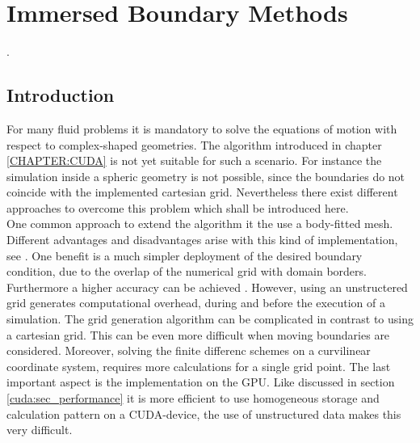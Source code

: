 \chapter{Immersed Boundary Methods}
\label{CHAPTER:IBM}.

\section{Introduction}

For many fluid problems it is mandatory to solve the equations of motion with respect to complex-shaped geometries.
The algorithm introduced in chapter \ref{CHAPTER:CUDA} is not yet suitable for such a scenario.
For instance the simulation inside a spheric geometry is not possible, since the boundaries
do not coincide with the implemented cartesian grid. Nevertheless there exist different approaches to overcome this problem
which shall be introduced here. \\
One common approach to extend the algorithm it the use a body-fitted mesh.
Different advantages and disadvantages arise with this kind of implementation, see \citep{Mittal2005}.
One benefit is a much simpler deployment of the desired boundary condition, due to the overlap of the numerical grid with domain borders.
Furthermore a higher accuracy can be achieved \citep{Gornak2013}.
However, using an unstructered grid generates  computational overhead, during and before the execution of a simulation.
The grid generation algorithm can be complicated in contrast to using a cartesian grid. This can be even more difficult when
moving boundaries are considered.
Moreover, solving the finite differenc schemes on a curvilinear coordinate system, requires more calculations for a single grid point.
The last important aspect is the implementation on the GPU.
Like discussed in section \ref{cuda:sec_performance} it is more efficient to use homogeneous storage and calculation pattern on a CUDA-device,
the use of unstructured data makes this very difficult.

